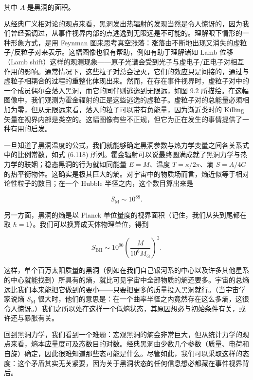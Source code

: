 其中 $A$ 是黑洞的面积。

从经典广义相对论的观点来看，黑洞发出热辐射的发现当然是令人惊讶的，因为我们曾经强调过，从事件视界内部的点逃逸到无限远是不可能的。理解眼下情形的一种形象方式，是用 Feynman 图来思考真空涨落：涨落由不断地出现又消失的虚粒子/反粒子对来表示。这幅图像也很有帮助，例如有助于理解诸如 Lamb 位移（Lamb shift）这样的观测现象——原子光谱会受到光子与虚电子/正电子对相互作用的影响。通常情况下，这些粒子对总会湮灭，它们的效应只是间接的，通过与虚粒子相耦合的过程的重整化体现出来。然而，在存在事件视界时，虚粒子对中的一个成员偶尔会落入黑洞，而它的同伴则逃逸到无限远，如图 9.2 所描绘。在这幅图像中，我们观测为霍金辐射的正是这些逃逸的虚粒子。虚粒子对的总能量必须相加为零，但从无限远来看，落入的粒子可以带有负能量，因为渐近类时的 Killing 矢量在视界内部是类空的。这幅图像有些不正规，但它为正在发生的事情提供了一种有用的启发。


一旦知道了黑洞温度的公式，我们就能够确定黑洞参数与热力学变量之间各关系式中的比例常数，如式 (6.118) 所列。霍金辐射可以说最终圆满成就了黑洞力学与热力学的联姻；稳态黑洞的行为就如同能量 $E = M$、温度 $T = \kappa/2\pi$、熵 $S = A/4G$ 的热平衡物体。这确实是极其巨大的熵。对宇宙中的物质场而言，熵近似等于相对论性粒子的数目；在一个 Hubble 半径之内，这个数目算出来是

\begin{equation*}
S_{\mathrm{M}} \sim 10^{88}.
\tag{9.176}
\end{equation*}

另一方面，黑洞的熵是以 Planck 单位量度的视界面积（记住，我们从头到尾都在取 $\hbar = 1$）。我们可以换算成天体物理单位，得到

\begin{equation*}
S_{\mathrm{BH}} \sim 10^{90} \left( \frac{M}{10^{6} M_{\odot}} \right)^{2}.
\tag{9.177}
\end{equation*}

这样，单个百万太阳质量的黑洞（例如在我们自己银河系的中心以及许多其他星系的中心就能找到）所具有的熵，就比可见宇宙中全部物质的熵还要多。宇宙的总熵远比我们本来能把它做到的要小——只要把更多的质量投入黑洞就行。（当宇宙学家说熵 $S_{\mathrm{M}}$ 很大时，他们的意思是：在一个曲率半径之内竟然存在这么多熵，这很令人惊讶。）我们之所以处在这样一个低熵状态，其原因想必与初始条件有关，或许还与暴胀有关。

回到黑洞力学，我们看到一个难题：宏观黑洞的熵会非常巨大，但从统计力学的观点来看，熵本应量度可及态数目的对数。经典黑洞由少数几个参数（质量、电荷和自旋）确定，因此很难知道那些态可能是什么。尽管如此，我们可以采取这样的态度：这个矛盾其实无关紧要，因为关于黑洞状态的任何信息想必都藏在事件视界背后。

